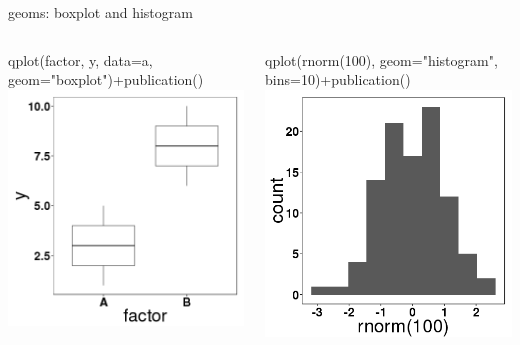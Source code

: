 \documentclass[t,10pt]{beamer}
\begin{document}
\begin{frame}[label={sec:orgheadline14}]{geoms: boxplot and histogram}
\begin{columns}
\begin{column}{0.5\columnwidth}
\begin{block}{qplot(factor, y, data=a, geom="boxplot")+publication()}
\includegraphics[width=.9\linewidth]{./boxplot.png}
\end{block}
\end{column}

\begin{column}{0.5\columnwidth}
\begin{block}{qplot(rnorm(100), geom="histogram", bins=10)+publication()}
\includegraphics[width=.9\linewidth]{./histogram.png}
\end{block}
\end{column}
\end{columns}
\end{frame}
\end{document}
